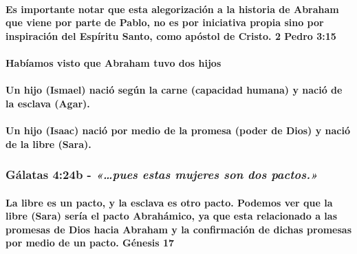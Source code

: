 \documentclass[11a pt,twoside]{article}
\newcommand{\scripture}[1]{%
  {\fontsize{12pt}{16pt}\selectfont\ScriptureFont\itshape #1}%
}
\let\oldsubsubsection\subsubsection
\renewcommand{\subsubsection}{\needspace{4\baselineskip}\oldsubsubsection}
\let\oldparagraph\paragraph
\renewcommand{\paragraph}{\needspace{3\baselineskip}\oldparagraph}
\begin{document}
\paragraph{Es importante notar que esta alegorización a la historia de
Abraham que viene por parte de Pablo, no es por iniciativa propia sino
por inspiración del Espíritu Santo, como apóstol de Cristo. 2 Pedro
3:15}\label{es-importante-notar-que-esta-alegorizaciuxf3n-a-la-historia-de-abraham-que-viene-por-parte-de-pablo-no-es-por-iniciativa-propia-sino-por-inspiraciuxf3n-del-espuxedritu-santo-como-apuxf3stol-de-cristo.-2-pedro-315}

\paragraph{Habíamos visto que Abraham tuvo dos
hijos}\label{habuxedamos-visto-que-abraham-tuvo-dos-hijos}

\paragraph{Un hijo (Ismael) nació según la carne (capacidad humana) y
nació de la esclava
(Agar).}\label{un-hijo-ismael-naciuxf3-seguxfan-la-carne-capacidad-humana-y-naciuxf3-de-la-esclava-agar.}

\paragraph{Un hijo (Isaac) nació por medio de la promesa (poder de Dios)
y nació de la libre
(Sara).}\label{un-hijo-isaac-naciuxf3-por-medio-de-la-promesa-poder-de-dios-y-naciuxf3-de-la-libre-sara.}

\subsubsection{\texorpdfstring{Gálatas 4:24b -
\scripture{«…pues estas mujeres son dos pactos.»}}{Gálatas 4:24b - }}\label{guxe1latas-424b---pues-estas-mujeres-son-dos-pactos.}

\paragraph{La libre es un pacto, y la esclava es otro pacto. Podemos ver
que la libre (Sara) sería el pacto Abrahámico, ya que esta relacionado a
las promesas de Dios hacia Abraham y la confirmación de dichas promesas
por medio de un pacto. Génesis
17}\label{la-libre-es-un-pacto-y-la-esclava-es-otro-pacto.-podemos-ver-que-la-libre-sara-seruxeda-el-pacto-abrahuxe1mico-ya-que-esta-relacionado-a-las-promesas-de-dios-hacia-abraham-y-la-confirmaciuxf3n-de-dichas-promesas-por-medio-de-un-pacto.-guxe9nesis-17}
\end{document}
